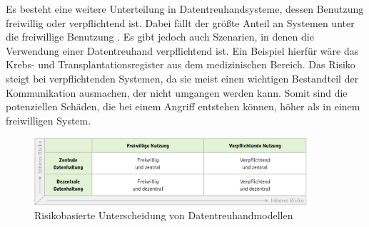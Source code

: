 \documentclass[
	fontsize=12pt,
	headings=small,
	parskip=half,           %
	bibliography=totoc,
	numbers=noenddot,       %
	open=any,               %
]{scrreprt}
\begin{document}
Es besteht eine weitere Unterteilung in Datentreuhandsysteme, dessen Benutzung freiwillig oder verpflichtend ist. Dabei fällt der größte Anteil an Systemen unter die freiwillige Benutzung . Es gibt jedoch auch Szenarien, in denen die Verwendung einer Datentreuhand verpflichtend ist. Ein Beispiel hierfür wäre das Krebs- und Transplantationsregister aus dem medizinischen Bereich. Das Risiko steigt bei verpflichtenden Systemen, da sie meist einen wichtigen Bestandteil der Kommunikation ausmachen, der nicht umgangen werden kann. Somit sind die potenziellen Schäden, die bei einem Angriff entstehen können, höher als in einem freiwilligen System.

\begin{figure}
    \centering
    \includegraphics[width=0.9\textwidth]{DT-RisikoEinteilung.png}
    \caption{Risikobasierte Unterscheidung von Datentreuhandmodellen \cite{dt-blankertz2021neue}}
    \label{fig:dt-risikoeinteilug}
\end{figure}
\end{document}
